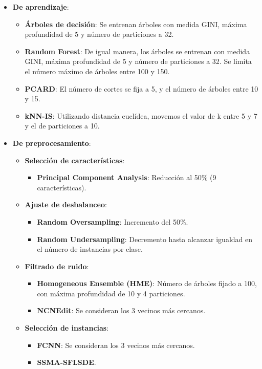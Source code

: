 \begin{itemize}
    \item \textbf{De aprendizaje}: \begin{itemize}
        \item \textbf{Árboles de decisión}: Se entrenan árboles con medida GINI, máxima profundidad de 5 y número de particiones a 32.
        \item \textbf{Random Forest}: De igual manera, los árboles se entrenan con medida GINI, máxima profundidad de 5 y número de particiones a 32. Se limita el número máximo de árboles entre 100 y 150.
        \item \textbf{PCARD}: El número de cortes se fija a 5, y el número de árboles entre 10 y 15.
        \item \textbf{kNN-IS}: Utilizando distancia euclídea, movemos el valor de k entre 5 y 7 y el de particiones a 10.
    \end{itemize}
    \item \textbf{De preprocesamiento}: \begin{itemize}
        \item \textbf{Selección de características}: \begin{itemize}
            \item \textbf{Principal Component Analysis}: Reducción al 50\% (9 características).
        \end{itemize}
        \item \textbf{Ajuste de desbalanceo}: \begin{itemize}
            \item \textbf{Random Oversampling}: Incremento del 50\%.
            \item \textbf{Random Undersampling}: Decremento hasta alcanzar igualdad en el número de instancias por clase.
        \end{itemize}
        \item \textbf{Filtrado de ruido}: \begin{itemize}
            \item \textbf{Homogeneous Ensemble (HME)}: Número de árboles fijado a 100, con máxima profundidad de 10 y 4 particiones.
            \item \textbf{NCNEdit}: Se consideran los 3 vecinos más cercanos.
        \end{itemize}
        \item \textbf{Selección de instancias}: \begin{itemize}
            \item \textbf{FCNN}: Se consideran los 3 vecinos más cercanos.
            \item \textbf{SSMA-SFLSDE}.
        \end{itemize}
    \end{itemize}
\end{itemize}
